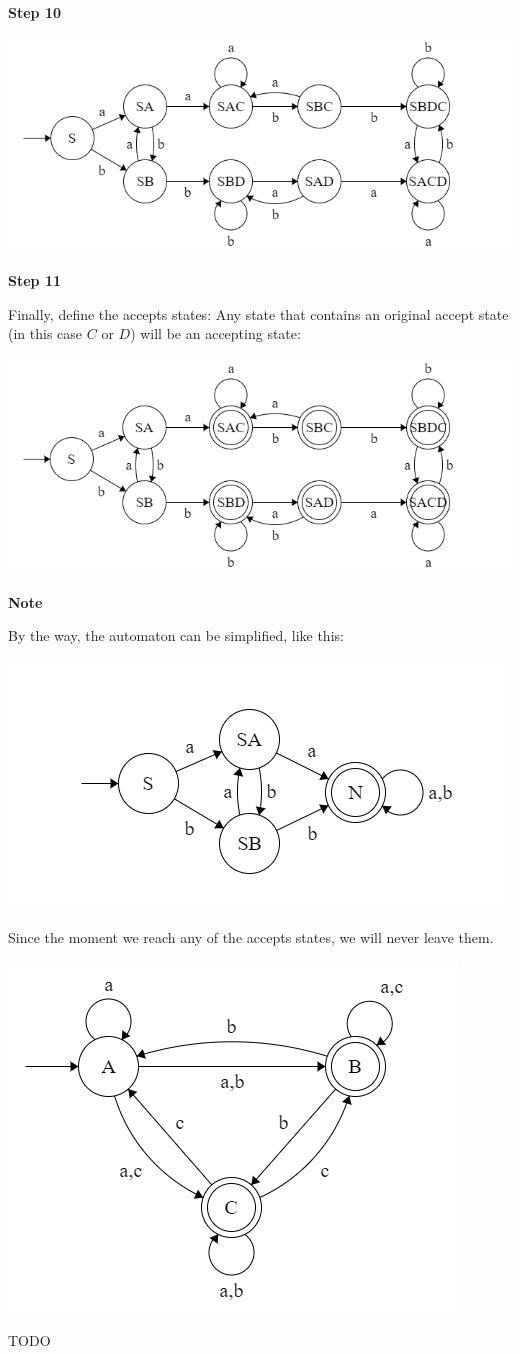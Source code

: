 \textbf{Step 10}

\includegraphics[width=0.9\linewidth]{02/dfa_step_10.png}

\textbf{Step 11}

Finally, define the accepts states: Any state that contains an original accept state (in this case $C$ or $D$) will be an accepting state:

\includegraphics[width=0.9\linewidth]{02/dfa_step_11.png}

\textbf{Note}

By the way, the automaton can be simplified, like this:

\includegraphics[width=0.7\linewidth]{02/dfa_final.png}

Since the moment we reach any of the accepts states, we will never leave them.


\includegraphics[width=0.5\linewidth]{02/2_6_2_automaton.png}

TODO